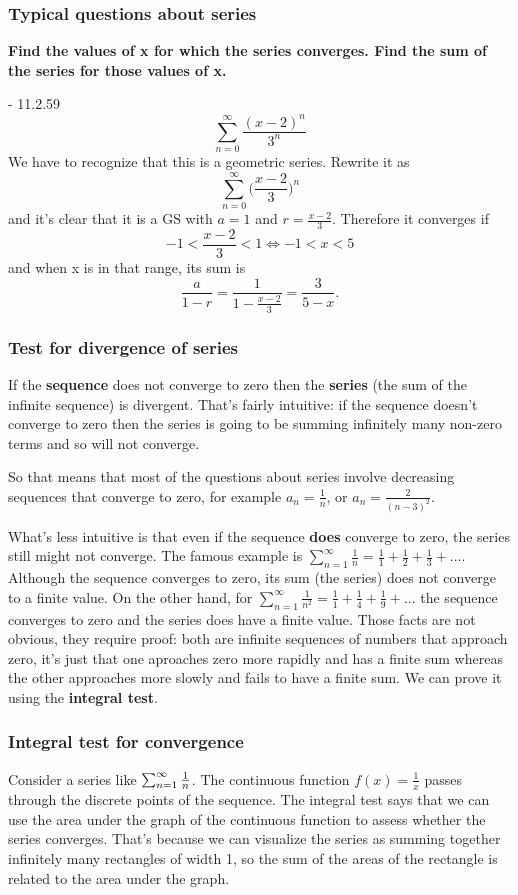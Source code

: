 \subsubsection{Typical questions about series}

\textbf{Find the values of x for which the series converges. Find the sum of the series for those values of x.}

- 11.2.59
  $$
  \sum_{n=0}^{\infty} \frac{(x-2)^n}{3^n}
  $$
  We have to recognize that this is a geometric series. Rewrite it as
  $$
  \sum_{n=0}^{\infty} \Big(\frac{x-2}{3}\Big)^n
  $$
  and it's clear that it is a GS with $a=1$ and $r=\frac{x-2}{3}$. Therefore it converges if
  $$
  -1 < \frac{x-2}{3} < 1 \Leftrightarrow -1 < x < 5
  $$
  and when x is in that range, its sum is
  $$
  \frac{a}{1-r} = \frac{1}{1 - \frac{x-2}{3}} = \frac{3}{5-x}.
  $$

\subsubsection{Test for divergence of series}
If the \textbf{sequence} does not converge to zero then the \textbf{series} (the sum of the infinite sequence) is divergent. That's fairly intuitive: if the sequence doesn't converge to zero then the series is going to be summing infinitely many non-zero terms and so will not converge.

So that means that most of the questions about series involve decreasing sequences that converge to zero, for example $a_n = \frac{1}{n}$, or $a_n = \frac{2}{(n-3)^2}$.

What's less intuitive is that even if the sequence \textbf{does} converge to zero, the series still might not converge. The famous example is $\sum_{n=1}^\infty \frac{1}{n} = \frac{1}{1} + \frac{1}{2} + \frac{1}{3} + ...$. Although the sequence converges to zero, its sum (the series) does not converge to a finite value. On the other hand, for $\sum_{n=1}^\infty \frac{1}{n^2} = \frac{1}{1} + \frac{1}{4} + \frac{1}{9} + ...$ the sequence converges to zero and the series does have a finite value. Those facts are not obvious, they require proof: both are infinite sequences of numbers that approach zero, it's just that one aproaches zero more rapidly and has a finite sum whereas the other approaches more slowly and fails to have a finite sum. We can prove it using the \textbf{integral test}.

\subsubsection{Integral test for convergence}
Consider a series like $\sum_{n=1}^{\infty} \frac{1}{n}$. The continuous function $f(x) = \frac{1}{x}$ passes through the discrete points of the sequence. The integral test says that we can use the area under the graph of the continuous function to assess whether the series converges. That's because we can visualize the series as summing together infinitely many rectangles of width 1, so the sum of the areas of the rectangle is related to the area under the graph.

